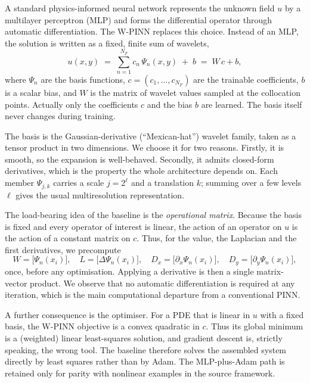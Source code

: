 \documentclass[preprint,12pt,authoryear]{elsarticle}
\begin{document}
A standard physics-informed neural network represents the unknown field $u$ by a multilayer perceptron (MLP) and forms the differential operator through automatic differentiation. The W-PINN replaces this choice. Instead of an MLP, the solution is written as a fixed, finite sum of wavelets,
\begin{equation}
u(x,y) \;=\; \sum_{n=1}^{N_F} c_n\,\Psi_n(x,y) \;+\; b \;=\; W\,c + b,
\label{eq:expansion}
\end{equation}
where $\Psi_n$ are the basis functions, $c=(c_1,\dots,c_{N_F})$ are the trainable coefficients, $b$ is a scalar bias, and $W$ is the matrix of wavelet values sampled at the collocation points. Actually only the coefficients $c$ and the bias $b$ are learned. The basis itself never changes during training.

The basis is the Gaussian-derivative (``Mexican-hat'') wavelet family, taken as a tensor product in two dimensions. We choose it for two reasons. Firstly, it is smooth, so the expansion is well-behaved. Secondly, it admits closed-form derivatives, which is the property the whole architecture depends on. Each member $\Psi_{j,k}$ carries a scale $j=2^{\ell}$ and a translation $k$; summing over a few levels $\ell$ gives the usual multiresolution representation.

The load-bearing idea of the baseline is the \emph{operational matrix}. Because the basis is fixed and every operator of interest is linear, the action of an operator on $u$ is the action of a constant matrix on $c$. Thus, for the value, the Laplacian and the first derivatives, we precompute
\begin{equation}
W = \big[\Psi_n(x_i)\big],\quad
L = \big[\Delta\Psi_n(x_i)\big],\quad
D_x = \big[\partial_x\Psi_n(x_i)\big],\quad
D_y = \big[\partial_y\Psi_n(x_i)\big],
\label{eq:opmats}
\end{equation}
once, before any optimisation. Applying a derivative is then a single matrix-vector product. We observe that no automatic differentiation is required at any iteration, which is the main computational departure from a conventional PINN.

A further consequence is the optimiser. For a PDE that is linear in $u$ with a fixed basis, the W-PINN objective is a convex quadratic in $c$. Thus its global minimum is a (weighted) linear least-squares solution, and gradient descent is, strictly speaking, the wrong tool. The baseline therefore solves the assembled system directly by least squares rather than by Adam. The MLP-plus-Adam path is retained only for parity with nonlinear examples in the source framework.
\end{document}
